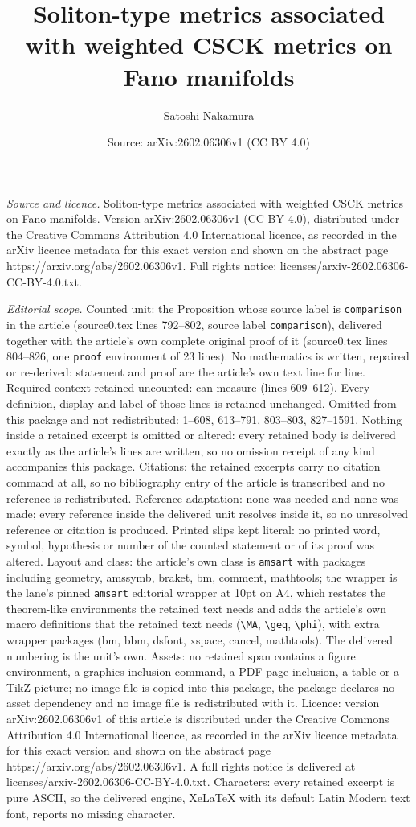 \documentclass[10pt,a4paper]{amsart}
\title[Soliton-type metrics associated with weighted CSCK metrics o]{Soliton-type metrics associated with weighted CSCK metrics on Fano manifolds}
\author{Satoshi Nakamura}
\date{Source: arXiv:2602.06306v1 (CC BY 4.0)}
\begin{document}
\maketitle

\noindent\emph{Source and licence.} Soliton-type metrics associated with weighted CSCK metrics on Fano manifolds. Version arXiv:2602.06306v1 (CC BY 4.0), distributed under the Creative Commons Attribution 4.0 International licence, as recorded in the arXiv licence metadata for this exact version and shown on the abstract page https://arxiv.org/abs/2602.06306v1. Full rights notice: licenses/arxiv-2602.06306-CC-BY-4.0.txt.\par\smallskip

\noindent\textit{Editorial scope.} Counted unit: the Proposition whose source label is \texttt{comparison} in the article (source0.tex lines 792--802, source label \texttt{comparison}), delivered together with the article's own complete original proof of it (source0.tex lines 804--826, one \texttt{proof} environment of 23 lines). No mathematics is written, repaired or re-derived: statement and proof are the article's own text line for line. Required context retained uncounted: can measure (lines 609--612). Every definition, display and label of those lines is retained unchanged. Omitted from this package and not redistributed: 1--608, 613--791, 803--803, 827--1591. Nothing inside a retained excerpt is omitted or altered: every retained body is delivered exactly as the article's lines are written, so no omission receipt of any kind accompanies this package. Citations: the retained excerpts carry no citation command at all, so no bibliography entry of the article is transcribed and no reference is redistributed. Reference adaptation: none was needed and none was made; every reference inside the delivered unit resolves inside it, so no unresolved reference or citation is produced. Printed slips kept literal: no printed word, symbol, hypothesis or number of the counted statement or of its proof was altered. Layout and class: the article's own class is \texttt{amsart} with packages including geometry, amssymb, braket, bm, comment, mathtools; the wrapper is the lane's pinned \texttt{amsart} editorial wrapper at 10pt on A4, which restates the theorem-like environments the retained text needs and adds the article's own macro definitions that the retained text needs (\texttt{\textbackslash MA}, \texttt{\textbackslash geq}, \texttt{\textbackslash phi}), with extra wrapper packages (bm, bbm, dsfont, xspace, cancel, mathtools). The delivered numbering is the unit's own. Assets: no retained span contains a figure environment, a graphics-inclusion command, a PDF-page inclusion, a table or a TikZ picture; no image file is copied into this package, the package declares no asset dependency and no image file is redistributed with it. Licence: version arXiv:2602.06306v1 of this article is distributed under the Creative Commons Attribution 4.0 International licence, as recorded in the arXiv licence metadata for this exact version and shown on the abstract page https://arxiv.org/abs/2602.06306v1. A full rights notice is delivered at licenses/arxiv-2602.06306-CC-BY-4.0.txt. Characters: every retained excerpt is pure ASCII, so the delivered engine, XeLaTeX with its default Latin Modern text font, reports no missing character.
\end{document}
